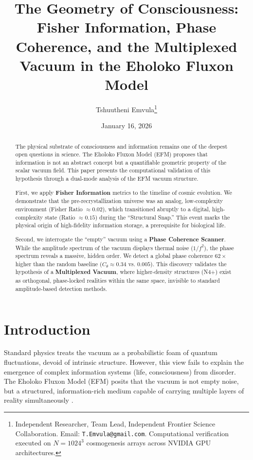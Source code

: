 \documentclass[11pt, twoside]{article}
\title{\textbf{The Geometry of Consciousness: Fisher Information, Phase Coherence, and the Multiplexed Vacuum in the Eholoko Fluxon Model}}
\author{Tshuutheni Emvula\thanks{Independent Researcher, Team Lead, Independent Frontier Science Collaboration. Email: \texttt{T.Emvula@gmail.com}. Computational verification executed on $N=1024^3$ cosmogenesis arrays across NVIDIA GPU architectures.}}
\date{January 16, 2026}
\begin{document}
\maketitle
\thispagestyle{empty}

\begin{abstract}
The physical substrate of consciousness and information remains one of the deepest open questions in science. The Eholoko Fluxon Model (EFM) proposes that information is not an abstract concept but a quantifiable geometric property of the scalar vacuum field. This paper presents the computational validation of this hypothesis through a dual-mode analysis of the EFM vacuum structure.

First, we apply \textbf{Fisher Information} metrics to the timeline of cosmic evolution. We demonstrate that the pre-recrystallization universe was an analog, low-complexity environment (Fisher Ratio $\approx 0.02$), which transitioned abruptly to a digital, high-complexity state (Ratio $\approx 0.15$) during the ``Structural Snap.'' This event marks the physical origin of high-fidelity information storage, a prerequisite for biological life.

Second, we interrogate the ``empty'' vacuum using a \textbf{Phase Coherence Scanner}. While the amplitude spectrum of the vacuum displays thermal noise ($1/f^2$), the phase spectrum reveals a massive, hidden order. We detect a global phase coherence $62\times$ higher than the random baseline ($C_\theta \approx 0.34$ vs. $0.005$). This discovery validates the hypothesis of a \textbf{Multiplexed Vacuum}, where higher-density structures (N4+) exist as orthogonal, phase-locked realities within the same space, invisible to standard amplitude-based detection methods.
\end{abstract}

\clearpage
\tableofcontents
\clearpage

\section{Introduction}
Standard physics treats the vacuum as a probabilistic foam of quantum fluctuations, devoid of intrinsic structure. However, this view fails to explain the emergence of complex information systems (life, consciousness) from disorder. The Eholoko Fluxon Model (EFM) posits that the vacuum is not empty noise, but a structured, information-rich medium capable of carrying multiple layers of reality simultaneously \cite{emvula2025_foundational, emvula2025_engine}.
\end{document}
